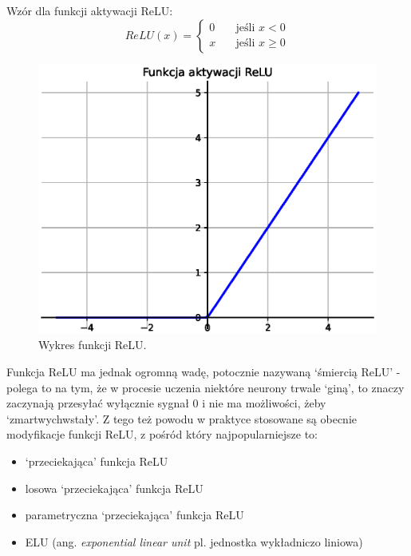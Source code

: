 \documentclass[a4paper,12pt]{article}
\numberwithin{figure}{section}
\begin{document}
    \bigskip

    \noindent
    \begin{minipage}[H]{\textwidth}
        \setlength\parindent{17pt} Wzór dla funkcji aktywacji ReLU: \\
        \begin{equation}
            \label{eq:relu}
            ReLU(x) =
            \begin{cases}
                0 & \quad \text{jeśli } x < 0 \\
                x & \quad \text{jeśli } x \geq 0
            \end{cases}
        \end{equation}
    \end{minipage}

    \bigskip

    \begin{figure}[H]
        \centering
        \includegraphics[width=\textwidth]{relu}
        \caption{Wykres funkcji ReLU.}
        \label{fig:relu}
    \end{figure}

    \bigskip

    Funkcja ReLU ma jednak ogromną wadę, potocznie nazywaną `śmiercią ReLU' - polega to na tym, że w procesie uczenia niektóre neurony trwale `giną', to znaczy zaczynają przesyłać wyłącznie sygnał 0 i nie ma możliwości, żeby `zmartwychwstały'\cite{UczenieMaszynowe2018}. Z tego też powodu w praktyce stosowane są obecnie modyfikacje funkcji ReLU, z pośród który najpopularniejsze to:
    \begin{itemize}
        \item `przeciekająca' funkcja ReLU
        \item losowa `przeciekająca' funkcja ReLU
        \item parametryczna `przeciekająca' funkcja ReLU
        \item ELU (ang. \textit{exponential linear unit} pl. jednostka wykładniczo liniowa)
    \end{itemize}
\end{document}
